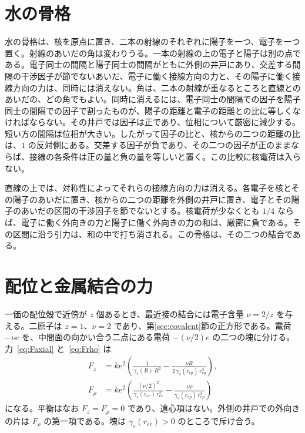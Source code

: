 \documentclass[a4paper]{article}
\begin{document}
\section{水の骨格}
\label{sec:water}

水の骨格は、核を原点に置き、二本の射線のそれぞれに陽子を一つ、電子を一つ置く。射線のあいだの角は変わりうる。一本の射線の上の電子と陽子は別の点である。電子同士の間隔と陽子同士の間隔がともに外側の井戸にあり、交差する間隔の干渉因子が節でないあいだ、電子に働く接線方向の力と、その陽子に働く接線方向の力は、同時には消えない。角は、二本の射線が重なるところと直線とのあいだの、どの角でもよい。同時に消えるには、電子同士の間隔での因子を陽子同士の間隔での因子で割ったものが、陽子の距離と電子の距離との比に等しくなければならない。その井戸では因子は正であり、位相について厳密に減少する。短い方の間隔は位相が大きい。したがって因子の比と、核からの二つの距離の比は、\(1\) の反対側にある。交差する因子が負であり、その二つの因子が正のままならば、接線の各条件は正の量と負の量を等しいと置く。この比較に核電荷は入らない。

直線の上では、対称性によってそれらの接線方向の力は消える。各電子を核とその陽子のあいだに置き、核からの二つの距離を外側の井戸に置き、電子とその陽子のあいだの区間の干渉因子を節でないとする。核電荷が少なくとも \(1/4\) ならば、電子に働く外向きの力と陽子に働く外向きの力の和は、厳密に負である。その区間に沿う引力は、和の中で打ち消される。この骨格は、その二つの結合である。

\section{配位と金属結合の力}
\label{sec:metal}

一価の配位殻で近傍が \(z\) 個あるとき、最近接の結合には電子含量 \(\nu=2/z\) を与える。二原子は \(z=1\)、\(\nu=2\) であり、第\ref{sec:covalent}節の正方形である。電荷 \(-\nu e\) を、中間面の向かい合う二点にある電荷 \(-(\nu/2)e\) の二つの塊に分ける。力~\eqref{eq:Faxial} と~\eqref{eq:Frho} は
\begin{align}
F_z
  &=k e^{2}\left(
    \frac{1}{\gamma_s(R)\,R^{2}}
    -\frac{\nu R}{2\,\gamma_s(r_{ep})\,r_{ep}^{3}}
  \right),
\label{eq:Fznu}\\
F_{\rho}
  &=k e^{2}\left(
    \frac{(\nu/2)^{2}}{\gamma_s(r_{ee})\,r_{ee}^{2}}
    -\frac{\nu\rho}{\gamma_s(r_{ep})\,r_{ep}^{3}}
  \right)
\end{align}
になる。平衡はなお \(F_z=F_{\rho}=0\) であり、遠心項はない。外側の井戸での外向きの片は \(F_{\rho}\) の第一項である。塊は \(\gamma_s(r_{ee})>0\) のところで斥け合う。
\end{document}
